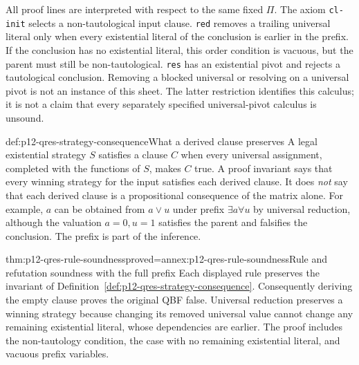 

All proof lines are interpreted with respect to the same fixed \(\Pi\).
The axiom \texttt{cl-init} selects a non-tautological input clause.
\texttt{red} removes a trailing universal literal only when every existential
literal of the conclusion is earlier in the prefix.  If the conclusion has
no existential literal, this order condition is vacuous, but the parent must
still be non-tautological.  \texttt{res} has an existential pivot and rejects
a tautological conclusion.  Removing a blocked universal or resolving on a
universal pivot is not an instance of this sheet.  The latter restriction
identifies this calculus; it is not a claim that every separately specified
universal-pivot calculus is unsound.

\begin{hbdefinition}{def:p12-qres-strategy-consequence}{What a derived clause preserves}
A legal existential strategy \(S\) satisfies a clause \(C\) when every
universal assignment, completed with the functions of \(S\), makes \(C\)
true.  A proof invariant says that every winning strategy for the input
satisfies each derived clause.  It does \emph{not} say that each derived
clause is a propositional consequence of the matrix alone.  For example,
\(a\) can be obtained from \(a\lor u\) under prefix \(\exists a\forall u\)
by universal reduction, although the valuation \(a=0,u=1\) satisfies the
parent and falsifies the conclusion.  The prefix is part of the inference.
\end{hbdefinition}

\begin{hbtheorem}{thm:p12-qres-rule-soundness}{proved=annex:p12-qres-rule-soundness}{Rule and refutation soundness with the full prefix}
Each displayed rule preserves the invariant of
Definition~\ref{def:p12-qres-strategy-consequence}.  Consequently deriving
the empty clause proves the original QBF false.  Universal reduction
preserves a winning strategy because changing its removed universal value
cannot change any remaining existential literal, whose dependencies are
earlier.  The proof includes the non-tautology condition, the case with no
remaining existential literal, and vacuous prefix variables.
\end{hbtheorem}

